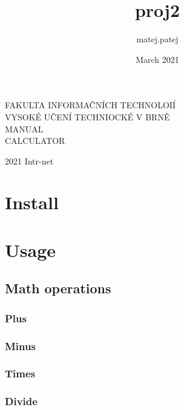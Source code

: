 \documentclass[11pt, a4paper]{article}
\title{proj2}
\author{matej.patej }
\date{March 2021}
\theoremstyle{definition}
\begin{document}
    \begin{titlepage}
        \begin{center}
            \vspace*{1cm}

            \huge
            \Huge F\huge AKULTA INFORMAČNÍCH TECHNOLOIÍ\\
            \hspace{0.2cm}
            \Huge V\huge YSOKÉ UČENÍ TECHNIOCKÉ V \Huge B\huge RNĚ\\
            MANUAL\\
            CALCULATOR


        \end{center}
        {\LARGE 2021 \hfill
        Intr-net}
    \end{titlepage}

    \newpage


    \section{Install}


    \section{Usage}

    \subsection{Math operations}

    \subsubsection{Plus}

    \subsubsection{Minus}

    \subsubsection{Times}

    \subsubsection{Divide}
\end{document}
